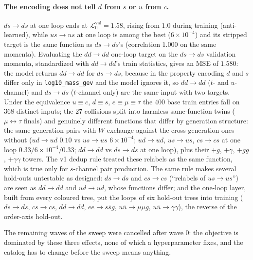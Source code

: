 \documentclass[11pt]{article}
\newcommand{\vlnr}{\mathcal{L}^{\mathrm{val}}_{0}}   %
\newcommand{\code}[1]{\texttt{#1}}
\begin{document}
\paragraph{The encoding does not tell $d$ from $s$ or $u$ from $c$.} $ds\to ds$ at one loop
ends at $\vlnr=1.58$, rising from $1.0$ during training (anti-learned), while $us\to us$ at
one loop is among the best ($6\times10^{-4}$) and its stripped target is the same function as
$ds\to ds$'s (correlation $1.000$ on the same momenta). Evaluating the $dd\to dd$ one-loop
target on the $ds\to ds$ validation momenta, standardized with $dd\to dd$'s train statistics,
gives an MSE of $1.580$: the model returns $dd\to dd$ for $ds\to ds$, because in the
property encoding $d$ and $s$ differ only in \code{log10\_mass\_gev} and the model ignores it,
so $dd\to dd$ ($t$- and $u$-channel) and $ds\to ds$ ($t$-channel only) are the same input with
two targets. Under the equivalence $u\equiv c$, $d\equiv s$, $e\equiv\mu\equiv\tau$ the $400$
base train entries fall on $368$ distinct inputs; the $27$ collisions split into harmless
same-function twins ($\mu\leftrightarrow\tau$ finals) and genuinely different functions that
differ by generation structure: the same-generation pairs with $W$ exchange against the
cross-generation ones without ($ud\to ud$ $0.10$ vs $us\to us$ $6\times10^{-4}$; $ud\to ud$,
$us\to us$, $cs\to cs$ at one loop $0.33/6\times10^{-4}/0.33$; $dd\to dd$ vs $ds\to ds$ at
one loop), plus their $+g$, $+\gamma$, $+gg$, $+\gamma\gamma$ towers. The v1 dedup rule treated
these relabels as the same function, which is true only for $s$-channel pair production. The
same rule makes several hold-outs untestable as designed: $ds\to ds$ and $cs\to cs$ (``relabels
of $us\to us$'') are seen as $dd\to dd$ and $ud\to ud$, whose functions differ; and the
one-loop layer, built from every coloured tree, put the loops of six hold-out trees into
training ($ds\to ds$, $cs\to cs$, $dd\to dd$, $ee\to s\bar sg$, $u\bar u\to\mu\mu g$,
$u\bar u\to\gamma\gamma$), the reverse of the order-axis hold-out.

The remaining waves of the sweep were cancelled after wave 0: the objective is dominated by
these three effects, none of which a hyperparameter fixes, and the catalog has to change
before the sweep means anything.
\end{document}
